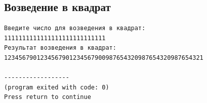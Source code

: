 \documentclass[a4paper,12pt]{article} %
\begin{document}
\subsection*{Возведение в квадрат}
\begin{verbatim}
Введите число для возведения в квадрат:
1111111111111111111111111111
Результат возведения в квадрат:
1234567901234567901234567900987654320987654320987654321

------------------
(program exited with code: 0)
Press return to continue
\end{verbatim}


\printbibliography
\end{document}
